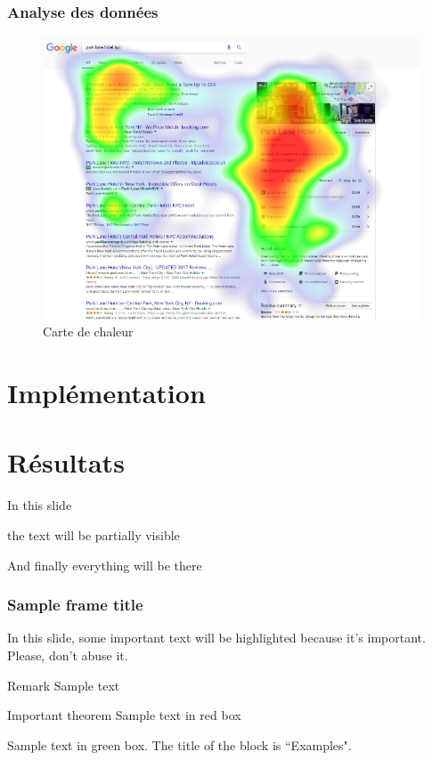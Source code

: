 \documentclass{beamer}
\begin{document}
\begin{frame}
  \frametitle{Analyse des données}
  \begin{figure}
    \includegraphics[height=0.5\textwidth]{heatmap.png}
    \caption{Carte de chaleur}
  \end{figure}
\end{frame}
\section{Implémentation}
\section{Résultats}
\begin{frame}
  In this slide \pause

  the text will be partially visible \pause

  And finally everything will be there
\end{frame}
\begin{frame}
  \frametitle{Sample frame title}

  In this slide, some important text will be
  \alert{highlighted} because it's important.
  Please, don't abuse it.

  \begin{block}{Remark}
    Sample text
  \end{block}

  \begin{alertblock}{Important theorem}
    Sample text in red box
  \end{alertblock}

  \begin{examples}
    Sample text in green box. The title of the block is ``Examples".
  \end{examples}
\end{frame}
\end{document}
